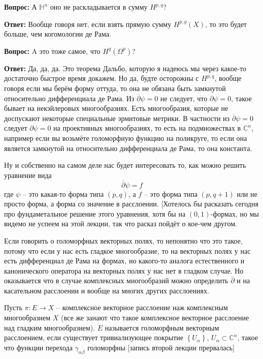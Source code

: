 \textbf{Вопрос:} А $\mathbb H^n$ оно не раскладывается в сумму $H^{p,q}$?

\textbf{Ответ:} Вообще говоря нет, если взять прямую сумму $H^{p,q}(X)$, то это
будет больше, чем когомологии де Рама.

\textbf{Вопрос:} A это тоже самое, что $H^q\left(\Omega^p\right)$?

\textbf{Ответ:} Да, да, да. Это теорема Дальбо, которую я надеюсь мы через
какое-то достаточно быстрое время докажем. Но да, будте осторожны с $H^{p,q}$,
вообще говоря если мы берём форму оттуда, то она не обязана быть замкнутой
относительно дифференциала де Рама. Из $\overline\partial\psi=0$ не следует, что
$\partial\psi=0$, такое бывает на некэйлеровых многообразиях. Есть многообразия,
которые не доспускают некоторые специальные эрмитовые метрики. В частности из 
$\overline\partial\psi=0$ следует $\partial\psi=0$ на проективных многообразиях,
то есть на подмножествах в $\mathbb C^n$, например если вы возьмёте голоморфную
функцию на поликруге, то если она является замкнутой на относительно
дифференциала де Рама, то она константа.

Ну и собственно на самом деле нас будет интересовать то, как можно решить
уравнение вида
\[\overline\partial\psi=f\]
где $\psi$ – это какая-то форма типа $(p,q)$, а $f$ – это форма типа $(p,q+1)$
или не просто форма, а форма со значение в расслоении. [Хотелось бы расказать
сегодня про фундаметальное решение этого уравнения, хотя бы на $(0,1)$-формах,
но мы видемо не успеем на этой лекции, так что расказ пойдёт о кое-чем другом.

Если говорить о голоморфных векторных полях, то непонятно что это такое, потому
что если у нас есть гладкое многообразие, то на векторных полях у нас есть
дифференциал де Рама на формах, но какого-то аналога естественного и канонического
оператора на векторных полях у нас нет в гладком случае. Но оказывается что в
случае комплексных многообразий можно определить $\overline\partial$ и на
касательном расслоении и вообще на многих других расслоениях.

\opr Пусть $\pi:E\rightarrow X$ – комплексное векторное расслоение наж комплексным
многообразием $X$ (все же занают что такое комплексное векторное расслоение над
гладким многообразием). $E$ называется голоморфным векторным расслоением, если
существует тривиализующее покрытие $\left\{U_\alpha\right\}$, $U_\alpha\subset
\mathbb C^n$, такое что функции перехода $\gamma_{\alpha\beta}$ голоморфны
[запись второй лекции прервалась]
